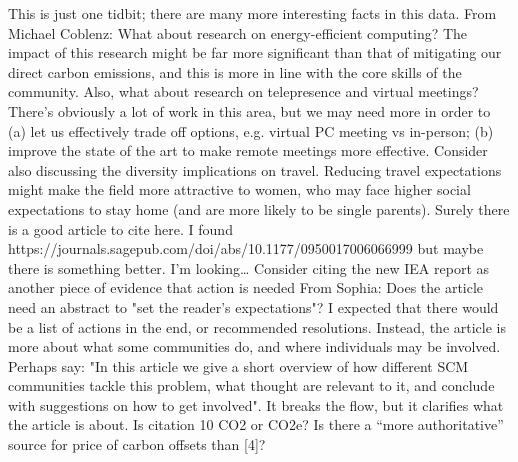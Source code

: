 \documentclass[12pt]{article}
\begin{document}
This is just one tidbit; there are many more interesting facts in this data.
From Michael Coblenz:
What about research on energy-efficient computing? The impact of this research might be far more significant than that of mitigating our direct carbon emissions, and this is more in line with the core skills of the community.
Also, what about research on telepresence and virtual meetings? There’s obviously a lot of work in this area, but we may need more in order to (a) let us effectively trade off options, e.g. virtual PC meeting vs in-person; (b) improve the state of the art to make remote meetings more effective.
Consider also discussing the diversity implications on travel. Reducing travel expectations might make the field more attractive to women, who may face higher social expectations to stay home (and are more likely to be single parents). Surely there is a good article to cite here. I found https://journals.sagepub.com/doi/abs/10.1177/0950017006066999 but maybe there is something better. I’m looking…
Consider citing the new IEA report as another piece of evidence that action is needed
From Sophia: Does the article need an abstract to "set the reader's expectations"? I expected that there would be a list of actions in the end, or recommended resolutions. Instead, the article is more about what some communities do, and where individuals may be involved.  Perhaps say: "In this article we give a short overview of how different SCM communities tackle this problem, what thought are relevant to it, and conclude with suggestions on how to get involved". It breaks the flow, but it clarifies what the article is about.
Is citation 10 CO2 or CO2e?
Is there a ``more authoritative'' source for price of carbon offsets than [4]?
\fi
\end{document}
